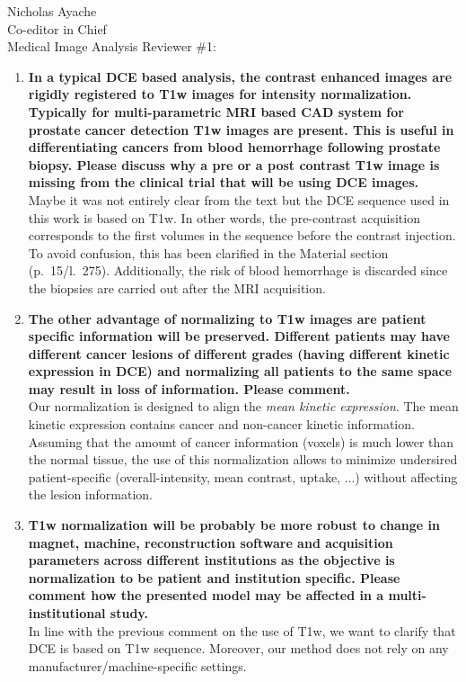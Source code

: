 \documentclass{letter}
\begin{document}
\begin{letter}{Nicholas Ayache \\ Co-editor in Chief \\ Medical Image Analysis}
  Reviewer \#1:
  \begin{enumerate}
  \item \textbf{In a typical DCE based analysis, the contrast
      enhanced images are rigidly registered to T1w images for
      intensity normalization. Typically for multi-parametric MRI
      based CAD system for prostate cancer detection T1w images
      are present. This is useful in differentiating cancers from
      blood hemorrhage following prostate biopsy. Please discuss
      why a pre or a post contrast T1w image is missing from the
      clinical trial that will be using DCE images.}\\
    Maybe it was not entirely clear from the text but the DCE sequence
    used in this work is based on T1w. In other words, the
    pre-contrast acquisition corresponds to the first volumes in the
    sequence before the contrast injection. To avoid confusion, this
    has been clarified in the Material section (p.~15/l.~275).
    Additionally, the risk of blood hemorrhage is discarded since the
    biopsies are carried out after the MRI acquisition.
  \item \textbf{The other advantage of normalizing to T1w images are
      patient specific information will be preserved. Different
      patients may have different cancer lesions of different grades
      (having different kinetic expression in DCE) and normalizing all
      patients to the same space may result in loss of
      information. Please comment.}\\
    Our normalization is designed to align the \emph{mean kinetic
      expression}. The mean kinetic expression contains cancer and
    non-cancer kinetic information. Assuming that the amount of cancer
    information (voxels) is much lower than the normal tissue, the use
    of this normalization allows to minimize undersired
    patient-specific (overall-intensity, mean contrast, uptake, ...)
    without affecting the lesion information.
  \item \textbf{T1w normalization will be probably be more robust to
      change in magnet, machine, reconstruction software and
      acquisition parameters across different institutions as the
      objective is normalization to be patient and institution
      specific. Please comment how the presented model may be affected
      in a multi-institutional study.}\\
    In line with the previous comment on the use of T1w, we want to
    clarify that DCE is based on T1w sequence.
    Moreover, our method does not rely on any manufacturer/machine-specific settings.

\end{enumerate}
\end{letter}
\end{document}

